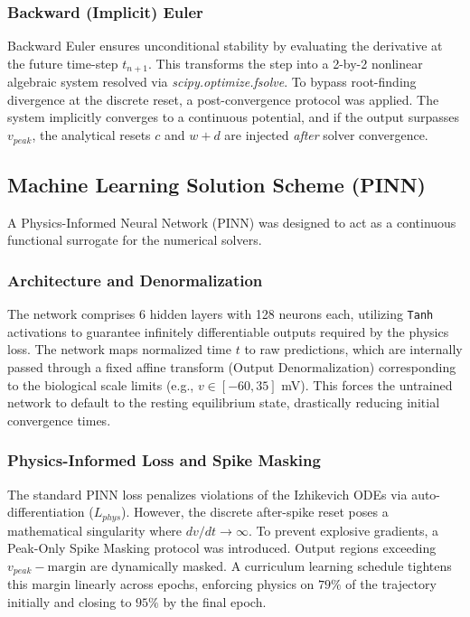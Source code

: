 \documentclass[conference]{IEEEtran}
\begin{document}
\subsubsection{Backward (Implicit) Euler}
Backward Euler ensures unconditional stability by evaluating the derivative at the future time-step $t_{n+1}$. This transforms the step into a 2-by-2 nonlinear algebraic system resolved via \textit{scipy.optimize.fsolve}. To bypass root-finding divergence at the discrete reset, a post-convergence protocol was applied. The system implicitly converges to a continuous potential, and if the output surpasses $v_{peak}$, the analytical resets $c$ and $w+d$ are injected \textit{after} solver convergence.

\subsection{Machine Learning Solution Scheme (PINN)}

A Physics-Informed Neural Network (PINN) was designed to act as a continuous functional surrogate for the numerical solvers. 

\subsubsection{Architecture and Denormalization}
The network comprises 6 hidden layers with 128 neurons each, utilizing \texttt{Tanh} activations to guarantee infinitely differentiable outputs required by the physics loss. The network maps normalized time $t$ to raw predictions, which are internally passed through a fixed affine transform (Output Denormalization) corresponding to the biological scale limits (e.g., $v \in [-60, 35]$ mV). This forces the untrained network to default to the resting equilibrium state, drastically reducing initial convergence times.

\subsubsection{Physics-Informed Loss and Spike Masking}
The standard PINN loss penalizes violations of the Izhikevich ODEs via auto-differentiation ($L_{phys}$). However, the discrete after-spike reset poses a mathematical singularity where $dv/dt \to \infty$. To prevent explosive gradients, a Peak-Only Spike Masking protocol was introduced. Output regions exceeding $v_{peak} - \text{margin}$ are dynamically masked. A curriculum learning schedule tightens this margin linearly across epochs, enforcing physics on $79\%$ of the trajectory initially and closing to $95\%$ by the final epoch.
\end{document}
